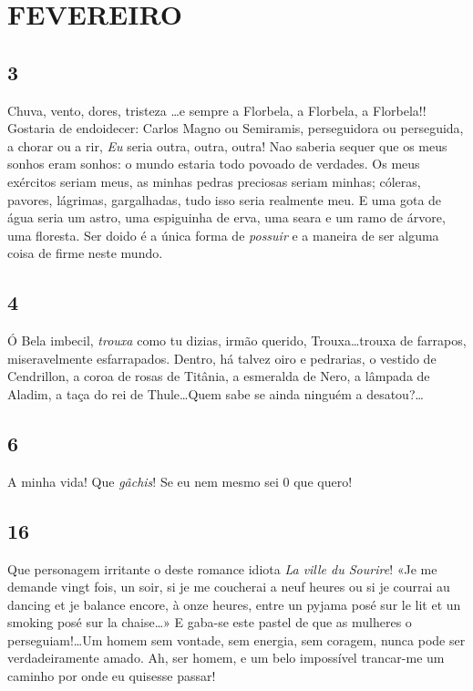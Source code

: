 \section{FEVEREIRO}

\subsection{3} 

Chuva, vento, dores, tristeza \ldots e sempre a 
Florbela, a Florbela, a Florbela!! Gostaria de endoidecer:
Carlos Magno ou Semiramis, perseguidora ou 
perseguida, a chorar ou a rir, \textit{Eu} seria outra, outra, outra!
Nao saberia sequer que os meus sonhos eram sonhos:
o mundo estaria todo povoado de verdades. Os meus
exércitos seriam meus, as minhas pedras preciosas seriam
minhas; cóleras, pavores, lágrimas, gargalhadas, tudo isso
seria realmente meu. E uma gota de água seria um astro,
uma espiguinha de erva, uma seara e um ramo de 
árvore, uma floresta. Ser doido é a única forma de \textit{possuir}
e a maneira de ser alguma coisa de firme neste
mundo.

\subsection{4} 

Ó Bela imbecil, \textit{trouxa} como tu dizias, irmão
querido, Trouxa\ldots trouxa de farrapos, miseravelmente
esfarrapados. Dentro, há talvez oiro e pedrarias, o
vestido de Cendrillon, a coroa de rosas de Titânia,
a esmeralda de Nero, a lâmpada de Aladim, a taça
do rei de Thule\ldots Quem sabe se ainda ninguém a
desatou?\ldots

\subsection{6} 

A minha vida! Que \textit{gâchis}! Se eu nem mesmo sei
0 que quero!

\subsection{16} 

Que personagem irritante o deste romance idiota
\textit{La ville du Sourire}! «Je me demande vingt fois,
un soir, si je me coucherai a neuf heures ou si je courrai
au dancing et je balance encore, à onze heures, entre
un pyjama posé sur le lit et un smoking posé sur la
chaise\ldots» E gaba-se este pastel de que as mulheres o
perseguiam!\ldots Um homem sem vontade, sem energia,
sem coragem, nunca pode ser verdadeiramente amado.
Ah, ser homem, e um belo impossível trancar-me um
caminho por onde eu quisesse passar!

